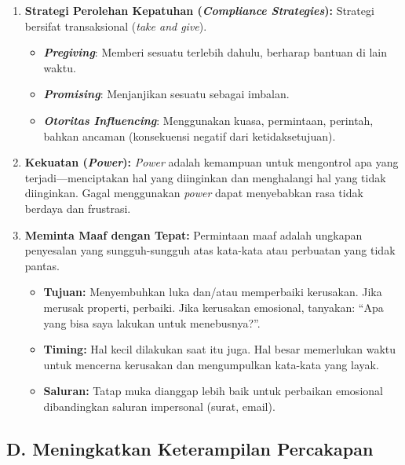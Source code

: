 \documentclass[
  letterpaper,
  DIV=11,
  numbers=noendperiod]{scrreprt}
\providecommand{\tightlist}{%
  \setlength{\itemsep}{0pt}\setlength{\parskip}{0pt}}
\begin{document}
\begin{enumerate}
\def\labelenumi{\arabic{enumi}.}
\tightlist
\item
  \textbf{Strategi Perolehan Kepatuhan (\emph{Compliance Strategies}):}
  Strategi bersifat transaksional (\emph{take and give}).

  \begin{itemize}
  \tightlist
  \item
    \textbf{\emph{Pregiving}}: Memberi sesuatu terlebih dahulu, berharap
    bantuan di lain waktu.
  \item
    \textbf{\emph{Promising}}: Menjanjikan sesuatu sebagai imbalan.
  \item
    \textbf{\emph{Otoritas Influencing}}: Menggunakan kuasa, permintaan,
    perintah, bahkan ancaman (konsekuensi negatif dari ketidaksetujuan).
  \end{itemize}
\item
  \textbf{Kekuatan (\emph{Power}):} \emph{Power} adalah kemampuan untuk
  mengontrol apa yang terjadi---menciptakan hal yang diinginkan dan
  menghalangi hal yang tidak diinginkan. Gagal menggunakan \emph{power}
  dapat menyebabkan rasa tidak berdaya dan frustrasi.
\item
  \textbf{Meminta Maaf dengan Tepat:} Permintaan maaf adalah ungkapan
  penyesalan yang sungguh-sungguh atas kata-kata atau perbuatan yang
  tidak pantas.

  \begin{itemize}
  \tightlist
  \item
    \textbf{Tujuan:} Menyembuhkan luka dan/atau memperbaiki kerusakan.
    Jika merusak properti, perbaiki. Jika kerusakan emosional, tanyakan:
    ``Apa yang bisa saya lakukan untuk menebusnya?''.
  \item
    \textbf{Timing:} Hal kecil dilakukan saat itu juga. Hal besar
    memerlukan waktu untuk mencerna kerusakan dan mengumpulkan kata-kata
    yang layak.
  \item
    \textbf{Saluran:} Tatap muka dianggap lebih baik untuk perbaikan
    emosional dibandingkan saluran impersonal (surat, email).
  \end{itemize}
\end{enumerate}

\subsection{D. Meningkatkan Keterampilan
Percakapan}\label{d.-meningkatkan-keterampilan-percakapan}
\end{document}
